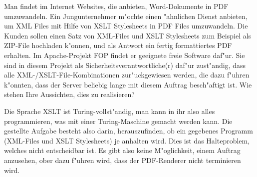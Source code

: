 Man findet im Internet Websites, die anbieten, Word-Dokumente in PDF
umzuwandeln.
Ein Jungunternehmer m"ochte einen "ahnlichen Dienst anbieten, um XML Files
mit Hilfe von XSLT Stylesheets in PDF Files umzuwandeln.
Die Kunden sollen einen Satz von XML-Files und XSLT Stylesheets zum
Beispiel als ZIP-File hochladen k"onnen, und als Antwort ein fertig
formattiertes PDF erhalten.
Im Apache-Projekt FOP findet er geeignete freie Software daf"ur.
Sie sind in diesem Projekt als Sicherheitsverantwortliche(r) daf"ur zust"andig,
dass alle XML-/XSLT-File-Kombinationen zur"uckgewiesen werden, die dazu f"uhren
k"onnten, dass der Server beliebig lange mit diesem Auftrag besch"aftigt
ist. Wie stehen Ihre Aussichten, dies zu realisieren?

\begin{loesung}
Die Sprache XSLT ist Turing-vollst"andig, man kann in ihr also alles
programmieren, was mit einer Turing-Maschine gemacht werden kann.
Die gestellte Aufgabe besteht also darin, herauszufinden, ob ein
gegebenes Programm (XML-Files und XSLT Stylesheets) je anhalten wird.
Dies ist das Halteproblem, welches nicht entscheidbar ist.
Es gibt also keine M"oglichkeit, einem Auftrag anzusehen, ober dazu
f"uhren wird, dass der PDF-Renderer nicht terminieren wird.
\end{loesung}

